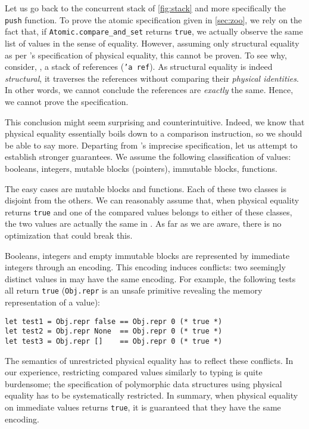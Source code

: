 Let us go back to the concurrent stack of \cref{fig:stack} and more specifically the \texttt{push} function.
To prove the atomic specification given in \cref{sec:zoo}, we rely on the fact that, if \texttt{Atomic.compare_and_set} returns \texttt{true}, we actually observe the same list of values in the sense of \Rocq equality.
However, assuming only structural equality as per \OCaml's specification of physical equality, this cannot be proven.
To see why, consider, \eg, a stack of references (\texttt{'a ref}).
As structural equality is indeed \emph{structural}, it traverses the references without comparing their \emph{physical identities}.
In other words, we cannot conclude the references are \emph{exactly} the same.
Hence, we cannot prove the specification.

This conclusion might seem surprising and counterintuitive.
Indeed, we know that physical equality essentially boils down to a comparison instruction, so we should be able to say more.
Departing from \OCaml's imprecise specification, let us attempt to establish stronger guarantees.
We assume the following classification of values: booleans, integers, mutable blocks (pointers), immutable blocks, functions.

The easy cases are mutable blocks and functions.
Each of these two classes is disjoint from the others.
We can reasonably assume that, when physical equality returns \texttt{true} and one of the compared values belongs to either of these classes, the two values are actually the same in \Rocq.
As far as we are aware, there is no optimization that could break this.

Booleans, integers and empty immutable blocks are represented by immediate integers through an encoding.
This encoding induces conflicts: two seemingly distinct values in \Rocq may have the same encoding.
For example, the following tests all return \texttt{true} (\texttt{Obj.repr} is an unsafe primitive revealing the memory representation of a value):
\begin{verbatim}
let test1 = Obj.repr false == Obj.repr 0 (* true *)
let test2 = Obj.repr None  == Obj.repr 0 (* true *)
let test3 = Obj.repr []    == Obj.repr 0 (* true *)
\end{verbatim}

The semantics of unrestricted physical equality has to reflect these conflicts.
In our experience, restricting compared values similarly to typing is quite burdensome; the specification of polymorphic data structures using physical equality has to be systematically restricted.
In summary, when physical equality on immediate values returns \texttt{true}, it is guaranteed that they have the same encoding.


